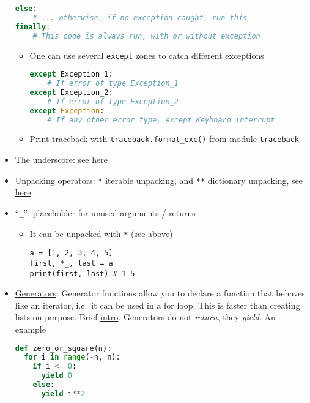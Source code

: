 \documentclass[a4paper,12pt,%
              final%
              ]{article}
\begin{document}
\begin{itemize}
\begin{lstlisting}[language=python]
else:
    # ... otherwise, if no exception caught, run this
finally:
    # This code is always run, with or without exception
\end{lstlisting}
    \begin{itemize}
      \item One can use several \texttt{except} zones to catch different exceptions
\begin{lstlisting}[language=python]
except Exception_1:
    # If error of type Exception_1
except Exception_2:
    # If error of type Exception_2
except Exception:
    # If any other error type, except Keyboard interrupt
\end{lstlisting}
      \item Print traceback with \verb|traceback.format_exc()| from module \texttt{traceback}
    \end{itemize}
  \item The underscore: see \href{https://dbader.org/blog/meaning-of-underscores-in-python}{here}
  \item Unpacking operators: \verb|*| iterable unpacking, and \verb|**| dictionary unpacking, see \href{https://geekflare.com/python-unpacking-operators/}{here}
  \item ``\verb|_|'': placeholder for unused arguments / returns
    \begin{itemize}
      \item It can be unpacked with \verb|*| (see above)
\begin{verbatim}
a = [1, 2, 3, 4, 5]
first, *_, last = a
print(first, last) # 1 5
\end{verbatim}
    \end{itemize}
  \item \href{https://wiki.python.org/moin/Generators}{Generators}: Generator functions allow you to declare a function that behaves like an iterator, i.e.\ it can be used in a for loop. This is faster than creating lists on purpose. Brief \href{https://www.programiz.com/python-programming/generator}{intro}. Generators do not \emph{return}, they \emph{yield}. An example
\begin{lstlisting}[language=python]
def zero_or_square(n):
  for i in range(-n, n):
    if i <= 0:
      yield 0
    else:
      yield i**2


\end{lstlisting}
\end{itemize}
\end{document}
